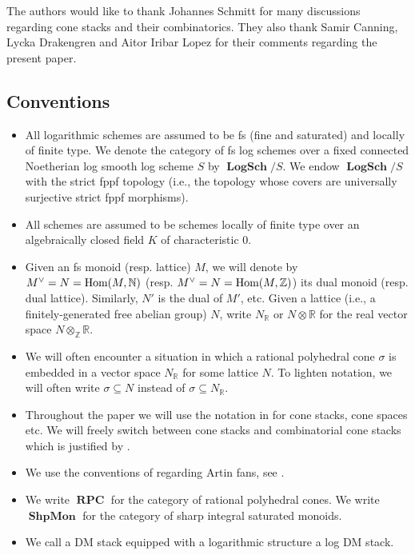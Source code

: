 \documentclass[11pt]{amsart}
\theoremstyle{definition}
\theoremstyle{remark}
\DeclareMathOperator{\LogSch}{\mathbf{LogSch}}
\DeclareMathOperator{\ShpMon}{\mathbf{ShpMon}}
\DeclareMathOperator{\RPC}{\mathbf{RPC}}
\DeclareMathOperator{\Hom}{\textup{Hom}}
\begin{document}
The authors would like to thank Johannes Schmitt for many discussions regarding
cone stacks and their combinatorics. They also thank Samir Canning, Lycka
Drakengren and Aitor Iribar Lopez for their comments regarding the present paper.

\subsection{Conventions}

\begin{itemize}
	\item All logarithmic schemes are assumed to be fs (fine and saturated) and locally of finite type. We denote the category
		of fs log schemes over a fixed connected Noetherian log smooth log scheme $S$ by $\LogSch/S$.
		We endow $\LogSch/S$ with the strict fppf topology (i.e., the topology whose covers are universally surjective strict
		fppf morphisms).
	\item All schemes are assumed to be schemes locally of finite type over an algebraically closed
		field $K$ of characteristic 0.
	\item Given an fs monoid (resp. lattice) $M$, we will denote by $M^{\vee}=N=\Hom(M,\mathbb{N})$ (resp. $M^{\vee}=N=\Hom(M,\mathbb{Z})$) its dual monoid (resp. dual lattice). Similarly, $N'$ is the dual of $M'$, etc. Given a lattice (i.e., a finitely-generated free abelian group)
		$N$, write $N_{\mathbb{R}}$ or $N\otimes \mathbb{R}$ for the real vector space $N\otimes _{\mathbb{Z}}\mathbb{R}$.
	\item We will often encounter a situation in which a rational polyhedral cone $\sigma$ is embedded in a vector space
		$N_{\mathbb{R}}$ for some lattice $N$. To lighten notation, we will often write $\sigma\subseteq N$ instead of
		$\sigma\subseteq N_{\mathbb{R}}$.
	\item Throughout the paper we will use the notation in \cite{AModuliStackCavali2017} for cone stacks, cone spaces
		etc. We will freely switch between cone stacks and combinatorial cone stacks which is justified by
		\cite[Proposition 2.19]{AModuliStackCavali2017}.
	\item We use the conventions of \cite{LogarithmicTauPandha2024} regarding Artin fans, see \cite[Definition 43]{LogarithmicTauPandha2024}.
	\item We write $\RPC$ for the category of rational polyhedral cones. We write $\ShpMon$ for the category of sharp integral saturated monoids.
	\item We call a DM stack equipped with a logarithmic structure a log DM stack.
\end{itemize}
\end{document}

